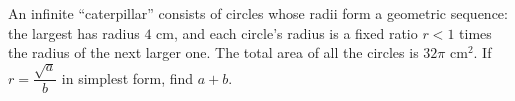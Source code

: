 An infinite ``caterpillar'' consists of circles whose radii form a geometric sequence: the largest has radius $4$ cm, and each circle's radius is a fixed ratio $r<1$ times the radius of the next larger one. The total area of all the circles is $32\pi$ cm$^2$. If $r=\dfrac{\sqrt a}{b}$ in simplest form, find $a+b$.
